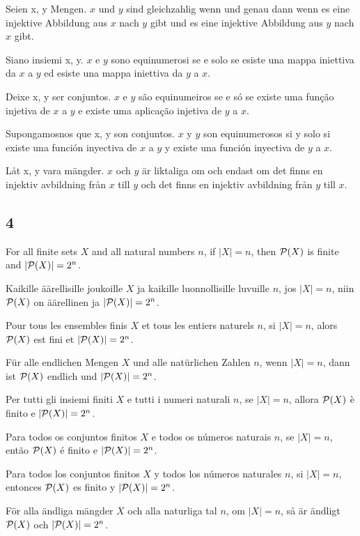 \documentclass{article}
\newcommand{\pow}{{\cal P}}
\begin{document}
Seien x, y Mengen. $ x $ und $ y $ sind gleichzahlig wenn und genau dann wenn es eine injektive Abbildung aus $ x $ nach $ y $ gibt und es eine injektive Abbildung aus $ y $ nach $ x $ gibt.

Siano insiemi x, y. $ x $ e $ y $ sono equinumerosi se e solo se esiste una mappa iniettiva da $ x $ a $ y $ ed esiste una mappa iniettiva da $ y $ a $ x $.

Deixe x, y ser conjuntos. $ x $ e $ y $ são equinumeiros se e só se existe uma função injetiva de $ x $ a $ y $ e existe uma aplicação injetiva de $ y $ a $ x $.

Supongamosnos que x, y son conjuntos. $ x $ y $ y $ son equinumerosos si y solo si existe una función inyectiva de $ x $ a $ y $ y existe una función inyectiva de $ y $ a $ x $.

Låt x, y vara mängder. $ x $ och $ y $ är liktaliga om och endast om det finns en injektiv avbildning från $ x $ till $ y $ och det finns en injektiv avbildning från $ y $ till $ x $.

\subsection*{4}

For all finite sets $ X $ and all natural numbers $ n $, if $ |X| = n $, then $ \pow(X) $ is finite and $ |\pow(X)| = 2^{n} $.

Kaikille äärellisille joukoille $ X $ ja kaikille luonnollisille luvuille $ n $, jos $ |X| = n $, niin $ \pow(X) $ on äärellinen ja $ |\pow(X)| = 2^{n} $.

Pour tous les ensembles finis $ X $ et tous les entiers naturels $ n $, si $ |X| = n $, alors $ \pow(X) $ est fini et $ |\pow(X)| = 2^{n} $.

Für alle endlichen Mengen $ X $ und alle natürlichen Zahlen $ n $, wenn $ |X| = n $, dann ist $ \pow(X) $ endlich und $ |\pow(X)| = 2^{n} $.

Per tutti gli insiemi finiti $ X $ e tutti i numeri naturali $ n $, se $ |X| = n $, allora $ \pow(X) $ è finito e $ |\pow(X)| = 2^{n} $.

Para todos os conjuntos finitos $ X $ e todos os números naturais $ n $, se $ |X| = n $, então $ \pow(X) $ é finito e $ |\pow(X)| = 2^{n} $.

Para todos los conjuntos finitos $ X $ y todos los números naturales $ n $, si $ |X| = n $, entonces $ \pow(X) $ es finito y $ |\pow(X)| = 2^{n} $.

För alla ändliga mängder $ X $ och alla naturliga tal $ n $, om $ |X| = n $, så är ändligt $ \pow(X) $ och $ |\pow(X)| = 2^{n} $.
\end{document}
